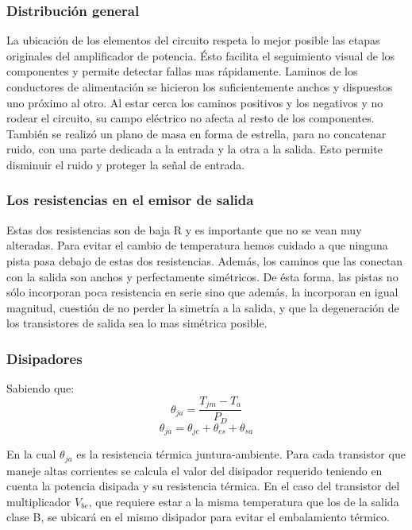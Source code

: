 \subsubsection*{Distribución general}
La ubicación de los elementos del circuito respeta lo mejor posible las etapas originales del amplificador de potencia. Ésto facilita el seguimiento visual de los componentes y permite detectar fallas mas rápidamente.
Laminos de los conductores de alimentación se hicieron los suficientemente anchos y dispuestos uno próximo al otro. Al estar cerca los caminos positivos y los negativos y no rodear el circuito, su campo eléctrico no afecta al resto de los componentes.
También se realizó un plano de masa en forma de estrella, para no concatenar ruido, con una parte dedicada a la entrada y la otra a la salida. Esto permite disminuir el ruido y proteger la señal de entrada.


\subsubsection*{Los resistencias en el emisor de salida}
Estas dos resistencias son de baja R y es importante que no se vean muy alteradas. Para evitar el cambio de temperatura hemos cuidado a que ninguna pista pasa debajo de estas dos resistencias. Además, los caminos que las conectan con la salida son anchos y perfectamente simétricos. De ésta forma, las pistas no sólo incorporan poca resistencia en serie sino que además, la incorporan en igual magnitud, cuestión de no perder la simetría a la salida, y que la degeneración de los transistores de salida sea lo mas simétrica posible.


\subsubsection{Disipadores}
\bigskip
Sabiendo que:
$$
   \theta_{ja}=\dfrac{T_{jm}-T_a}{P_D}
$$
$$
	\theta_{ja}=\theta_{jc}+\theta_{cs}+\theta_{sa}
$$

En la cual $\theta_{ja}$ es la resistencia térmica juntura-ambiente. Para cada transistor que maneje altas corrientes se calcula el valor del disipador requerido teniendo en cuenta la potencia disipada y su resistencia térmica. En el caso del transistor del multiplicador $V_{be}$, que requiere estar a la misma temperatura que los de la salida clase B, se ubicará en el mismo disipador para evitar el embalamiento térmico.

